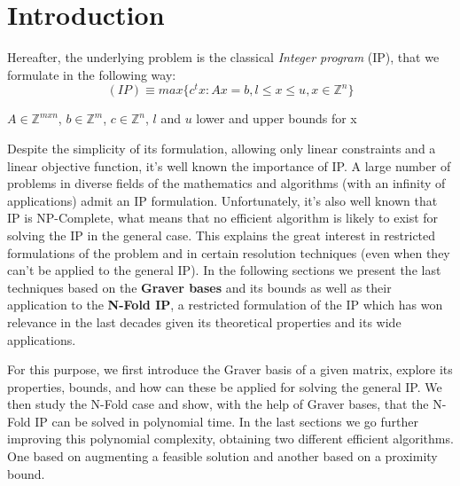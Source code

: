 \chapter{Introduction} \label{introduction}


Hereafter, the underlying problem is the classical \textit{Integer program} (IP), that we formulate in the following way:
\begin{equation*}
    (IP) \equiv max\{c^tx : Ax = b, l \leq x \leq u, x \in \mathbb{Z}^n \}
\end{equation*}
\vspace{-50pt}
\begin{center}
$A \in \mathbb{Z}^{mxn}$, $b \in \mathbb{Z}^m$, $c \in \mathbb{Z}^n$, $l$  and $u$ lower and upper bounds for x
\end{center}


Despite the simplicity of its formulation, allowing only linear constraints and a linear objective function, it's well known the importance of IP. A large number of problems in diverse fields of the mathematics and algorithms (with an infinity of applications) admit an IP formulation. Unfortunately, it's also well known that IP is NP-Complete, what means that no efficient algorithm is likely to exist for solving the IP in the general case. This explains the great interest in restricted formulations of the problem and in certain resolution techniques (even when they can't be applied to the general IP). In the following sections we present the last techniques based on the \textbf{Graver bases} and its bounds as well as their application to the \textbf{N-Fold IP}, a restricted formulation of the IP which has won relevance in the last decades given its theoretical properties and its wide applications. 


For this purpose, we first introduce the Graver basis of a given matrix, explore its properties, bounds, and how can these be applied for solving the general IP. We then study the N-Fold case and show, with the help of Graver bases, that the N-Fold IP can be solved in polynomial time. In the last sections we go further improving this polynomial complexity, obtaining two different efficient algorithms. One based on augmenting a feasible solution and another based on a proximity bound. 

